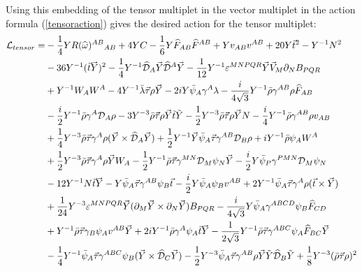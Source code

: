 \documentclass[a4paper,12pt, twoside]{article}
\numberwithin{equation}{section}
\begin{document}
Using this embedding of the tensor multiplet in the vector multiplet in 
the action formula (\ref{tensoraction}) gives the desired action for 
the tensor multiplet:
\begin{equation}
\begin{split}
{\cal L}_{tensor} = & 
-\frac{1}{4}YR(\widehat{\omega})^{AB}{}_{AB}+4YC-\frac{1}{6}Y\widehat{F}_{AB}\widehat{F}^{AB}+Yv_{AB}v^{AB}+20 
Y\vec{t}^2  -  Y^{-1}N^2\\
&  - 36Y^{-1}(\vec{t}\vec{Y})^2 -\frac{1}{4}Y^{-1}\widehat{\cal 
D}_A\vec{Y}\widehat{\cal D}^A\vec{Y}- 
\frac{1}{12}Y^{-1}\varepsilon^{MNPQR}\vec{Y}\vec{V}_M\partial_N B_{PQR}\\ 
& + Y^{-1}W_A W^A- 4Y^{-1}\bar{\lambda}\vec{\tau}\rho\vec{Y} 
-  
2iY\bar{\psi}_A\gamma^A\lambda-\frac{i}{4\sqrt{3}}Y^{-1}\bar{\rho}\gamma^{AB}\rho\widehat{F}_{AB}\\
& - \frac{i}{2}Y^{-1}\bar{\rho}\gamma^A {\cal 
D}_A\rho-3Y^{-3}\bar{\rho}\vec{\tau}\rho\vec{Y}\tilde{t}\tilde{Y} - 
\frac{1}{2}Y^{-3}\bar{\rho}\vec{\tau}\rho\vec{Y}N-\frac{i}{4}Y^{-1}\bar{\rho}\gamma^{AB}\rho 
v_{AB}\\
& +\frac{1}{4}Y^{-3}\bar{\rho}\vec{\tau}\gamma^A\rho(\vec{Y}\times 
\widehat{\cal D}_A\vec{Y}) 
+\frac{1}{2}Y^{-1}\vec{Y}\bar{\psi}_A\vec{\tau}\gamma^{AB}{\cal D}_B\rho+ iY^{-1}\bar{\rho}\psi_A W^A\\
&  + \frac{1}{2}Y^{-3}\bar{\rho}\vec{\tau}\gamma^A\rho \vec{Y}W_A - 
\frac{1}{2}Y^{-1}\bar{\rho}\vec{\tau}\gamma^{MN}{\cal D}_M\psi_N 
\vec{Y}-\frac{i}{2}Y\bar{\psi}_P\gamma^{PMN}{\cal D}_M\psi_N\\ 
& -12 Y^{-1}N\vec{t}\vec{Y}-Y\bar{\psi}_A\vec{\tau}\gamma^{AB}\psi_B 
\vec{t}-\frac{i}{2}Y\bar{\psi}_A\psi_B 
v^{AB}+2Y^{-1}\bar{\psi}_A\vec{\tau}\gamma^A\rho(\vec{t}\times\vec{Y})\\
& + 
\frac{1}{24}Y^{-3}\varepsilon^{MNPQR}\vec{Y}(\partial_M\vec{Y}\times\partial_N\vec{Y})B_{PQR}
-  
\frac{i}{4\sqrt{3}}Y\bar{\psi}_A\gamma^{ABCD}\psi_B\widehat{F}_{CD}\\
& + Y^{-1}\bar{\rho}\vec{\tau}\gamma_B\psi_A v^{AB}\vec{Y} 
+2iY^{-1}\bar{\rho}\gamma^A\psi_A\vec{t}\vec{Y}- 
\frac{1}{2\sqrt{3}}Y^{-1}\bar{\rho}\vec{\tau}\gamma^{ABC}\psi_A\widehat{F}_{BC}\vec{Y}\\
&  - 
\frac{1}{4}Y^{-1}\bar{\psi}_A\vec{\tau}\gamma^{ABC}\psi_B(\vec{Y}\times\widehat{\cal D}_C\vec{Y}) - 
\frac{1}{2}Y^{-3}\bar{\psi}_A\vec{\tau}\gamma^{AB}\rho\vec{Y}\tilde{Y}\widehat{\cal 
D}_B\tilde{Y}+\frac{1}{8}Y^{-3}(\bar{\rho}\vec{\tau}\rho)^2\\

\end{split}
\end{equation}
\end{document}
